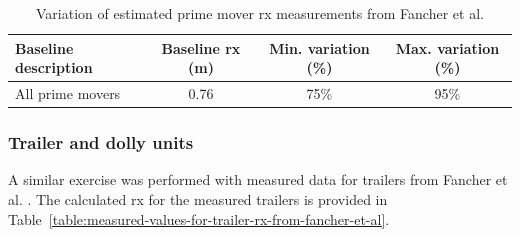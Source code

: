 \begin{table}[H]
	\centering\footnotesize
	\begin{threeparttable}

		\begin{tabulary}{\textwidth}{lccc}
			\toprule
			\textbf{Baseline description} & \textbf{Baseline \gls{rx} (m)} & \textbf{Min. variation (\%)} & \textbf{Max. variation (\%)} \\
			\midrule
			All prime movers & 0.76 & 75\%  & 95\% \\
			\bottomrule
		\end{tabulary}

		\caption{Variation of estimated prime mover \gls{rx} measurements from Fancher et al. \cite{Fancher1986}}
		\label{table:variation-of-estimated-rx-measurements-from-Fancher-et-al-prime-mover}


	\end{threeparttable}
\end{table}

\subsubsection{Trailer and dolly units}\label{section:pr-roll-moment-of-inertia-trailer-vehicle-units}

A similar exercise was performed with measured data for trailers from Fancher et al. \cite{Fancher1986}. The calculated \gls{rx} for the measured trailers is provided in Table~\ref{table:measured-values-for-trailer-rx-from-fancher-et-al}.

